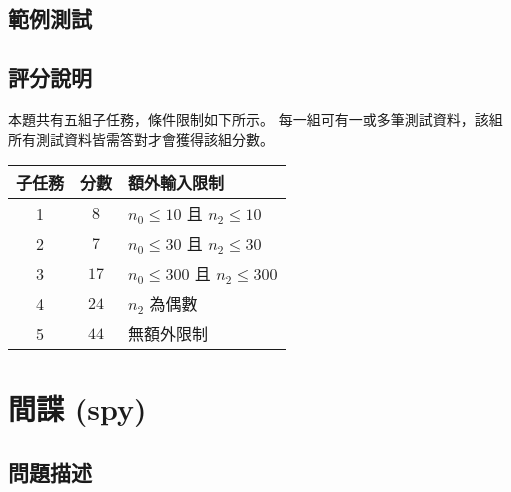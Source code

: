 \subsection{範例測試}

\begin{example}
%
%
\end{example}

\subsection{評分說明}

本題共有五組子任務，條件限制如下所示。
每一組可有一或多筆測試資料，該組所有測試資料皆需答對才會獲得該組分數。

\begin{longtable}[]{@{}ccl@{}}
\toprule
子任務 & 分數 & 額外輸入限制 \\
\midrule
\endhead
1 & \(8\) & \begin{math}n_0\le10\end{math} 且
\begin{math}n_2\le10\end{math} \\
2 & \(7\) & \begin{math}n_0\le30\end{math} 且
\begin{math}n_2\le30\end{math} \\
3 & \(17\) & \begin{math}n_0\le300\end{math} 且
\begin{math}n_2\le300\end{math} \\
4 & \(24\) & \begin{math}n_2\end{math} 為偶數 \\
5 & \(44\) & 無額外限制 \\
\bottomrule
\end{longtable}

\section{間諜 (spy)}

\subsection{問題描述}

